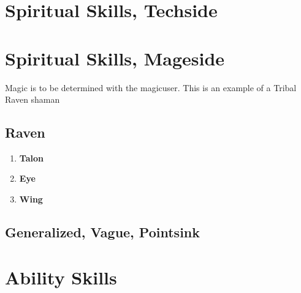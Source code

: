 \section{Spiritual Skills, Techside}\label{sec:spiritual-skills,-techside}

\section{Spiritual Skills, Mageside}\label{sec:spiritual-skills,-magicside}
Magic is to be determined with the magicuser.
This is an example of a Tribal Raven shaman
\subsection{Raven}\label{subsec:raven}
\begin{enumerate}[label= - ]
    \item \textbf{Talon} 
    \item \textbf{Eye} 
    \item \textbf{Wing} 
\end{enumerate}
\subsection{Generalized, Vague, Pointsink}\label{subsec:GVPS}

\section{Ability Skills}\label{sec:ability-skills}
